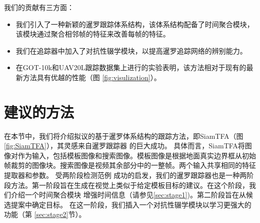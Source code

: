 我们的贡献有三方面：
\begin{itemize}
\item 我们引入了一种新颖的暹罗跟踪体系结构，该体系结构配备了时间聚合模块，该模块通过聚合相邻帧的特征来改善每帧的特征。
\item 我们在追踪器中加入了对抗性辍学模块，以提高暹罗追踪网络的辨别能力。
\item 在GOT-10k和UAV20L跟踪数据集上进行的实验表明，该方法相对于现有的最新方法具有优越的性能（图 \ref{fig:visulization}）。
\end{itemize}

\section{建议的方法}
\label{sec:method}
在本节中，我们将介绍拟议的基于暹罗体系结构的跟踪方法，即SiamTFA（图\ref{fig:SiamTFA}），其灵感来自暹罗跟踪器 \cite{SiamRPN++, Wang2018SiamMask}的巨大成功。
具体而言，SiamTFA将图像对作为输入，包括模板图像和搜索图像。模板图像是根据地面真实边界框从初始帧裁剪的图像块。搜索图像是视频其余部分中的一整帧。两个输入共享相同的特征提取器和参数。
受两阶段检测范例 \cite{ren2015faster}成功的启发，我们的暹罗跟踪器也是一种两阶段方法。第一阶段旨在生成在视觉上类似于给定模板目标的建议。在这个阶段，我们介绍一个时间聚合模块
增强时间信息（请参见\ref{sec:stage1})。第二阶段旨在从候选提案中确定目标。
在这一阶段，我们插入一个对抗性辍学模块以学习更强大的功能（第 \ref{sec:stage2}节）。


